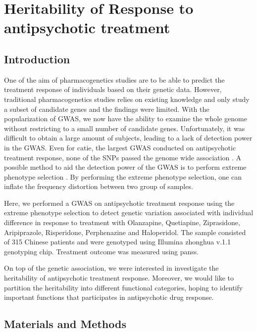 
	\chapter{Heritability of Response to antipsychotic treatment}
	\section{Introduction}
	One of the aim of pharmacogenetics studies are to be able to predict the treatment response of individuals based on their genetic data.
	However, traditional pharmacogenetics studies relies on existing knowledge and only study a subset of candidate genes and the findings were limited.
	With the popularization of \gls{GWAS}, we now have the ability to examine the whole genome without restricting to a small number of candidate genes. 
	Unfortunately, it was difficult to obtain a large amount of subjects, leading to a lack of detection power in the \gls{GWAS}. 
	Even for \gls{catie}, the largest \gls{GWAS} conducted on antipsychotic treatment response, none of the \glspl{SNP} passed the genome wide association \citep{McClay2011}.
	A possible method to aid the detection power of the \gls{GWAS} is to perform extreme phenotype selection \citep{Guey2011}.
	By performing the extreme phenotype selection, one can inflate the frequency distortion between two group of samples.
	
	Here, we performed a \gls{GWAS} on antipsychotic treatment response using the extreme phenotype selection to detect genetic variation associated with individual difference in response to treatment with Olanzapine, Quetiapine, Ziprasidone, Aripiprazole, Risperidone, Perphenazine and Haloperidol. 
	The sample consisted of 315 Chinese  patients and were genotyped using Illumina zhonghua v.1.1 genotyping chip.
	Treatment outcome was measured using \gls{panss}.
	
	On top of the genetic association, we were interested in investigate the heritability of antipsychotic treatment response.
	Moreover, we would like to partition the heritability into different functional categories, hoping to identify important functions that participates in antipsychotic drug response. 
	
	\section{Materials and Methods}
